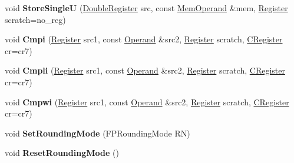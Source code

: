 \begin{DoxyCompactItemize}
\item 
\mbox{\label{classv8_1_1internal_1_1TurboAssembler_a13233d9ce802db92f284f2bd1391709c}} 
void {\bfseries Store\+SingleU} (\mbox{\hyperlink{classv8_1_1internal_1_1DoubleRegister}{Double\+Register}} src, const \mbox{\hyperlink{classv8_1_1internal_1_1MemOperand}{Mem\+Operand}} \&mem, \mbox{\hyperlink{classv8_1_1internal_1_1Register}{Register}} scratch=no\+\_\+reg)
\item 
\mbox{\label{classv8_1_1internal_1_1TurboAssembler_a681e36f7cfd68d8c76f8b2fa4cff830c}} 
void {\bfseries Cmpi} (\mbox{\hyperlink{classv8_1_1internal_1_1Register}{Register}} src1, const \mbox{\hyperlink{classv8_1_1internal_1_1Operand}{Operand}} \&src2, \mbox{\hyperlink{classv8_1_1internal_1_1Register}{Register}} scratch, \mbox{\hyperlink{classv8_1_1internal_1_1CRegister}{C\+Register}} cr=cr7)
\item 
\mbox{\label{classv8_1_1internal_1_1TurboAssembler_a8ab7b01743a68aa72a4f53782f8fb0db}} 
void {\bfseries Cmpli} (\mbox{\hyperlink{classv8_1_1internal_1_1Register}{Register}} src1, const \mbox{\hyperlink{classv8_1_1internal_1_1Operand}{Operand}} \&src2, \mbox{\hyperlink{classv8_1_1internal_1_1Register}{Register}} scratch, \mbox{\hyperlink{classv8_1_1internal_1_1CRegister}{C\+Register}} cr=cr7)
\item 
\mbox{\label{classv8_1_1internal_1_1TurboAssembler_a50f45d59c7c9ae57761a01ef71426c2a}} 
void {\bfseries Cmpwi} (\mbox{\hyperlink{classv8_1_1internal_1_1Register}{Register}} src1, const \mbox{\hyperlink{classv8_1_1internal_1_1Operand}{Operand}} \&src2, \mbox{\hyperlink{classv8_1_1internal_1_1Register}{Register}} scratch, \mbox{\hyperlink{classv8_1_1internal_1_1CRegister}{C\+Register}} cr=cr7)
\item 
\mbox{\label{classv8_1_1internal_1_1TurboAssembler_abf5be88b3e4b4ebe838da239662de5fd}} 
void {\bfseries Set\+Rounding\+Mode} (F\+P\+Rounding\+Mode RN)
\item 
\mbox{\label{classv8_1_1internal_1_1TurboAssembler_a173b55d139ff2c9ff4841e3738255cb3}} 
void {\bfseries Reset\+Rounding\+Mode} ()

\end{DoxyCompactItemize}
